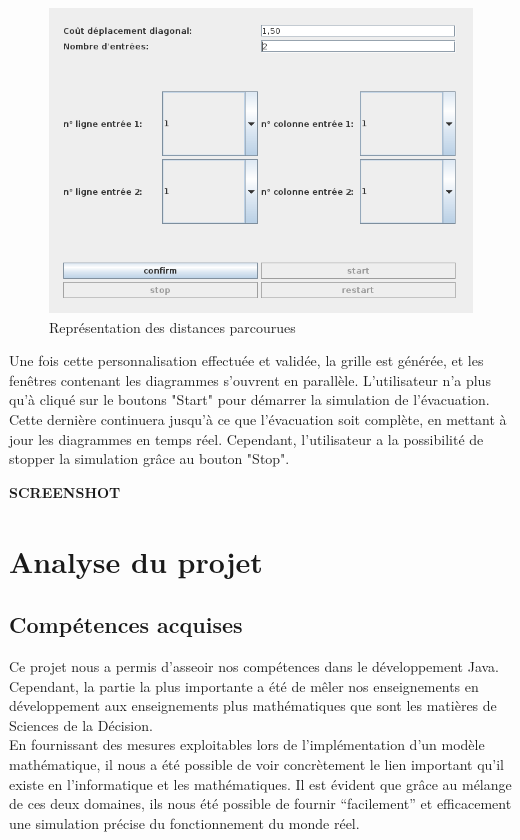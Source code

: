 \documentclass[twoside,UTF8]{EPURapport}
\begin{document}
		\begin{figure}[htb]
	\centering
	\includegraphics[scale=0.7]{imagesPNG/personnalisation.png}
	\caption{Représentation des distances parcourues}
	\label{fig:distances_parcourues}
	\end{figure}
		
		Une fois cette personnalisation effectuée et validée, la grille est générée, et les fenêtres contenant les diagrammes s'ouvrent en parallèle. L'utilisateur n'a plus qu'à cliqué sur le boutons "Start" pour démarrer la simulation de l'évacuation. Cette dernière continuera jusqu'à ce que l'évacuation soit complète, en mettant à jour les diagrammes en temps réel. Cependant, l'utilisateur a la possibilité de stopper la simulation grâce au bouton "Stop".
		
		\textbf{SCREENSHOT}
		
\chapter{Analyse du projet}
	\section{Compétences acquises}
	Ce projet nous a permis d'asseoir nos compétences dans le développement Java. Cependant, la partie la plus importante a été de mêler nos enseignements en développement aux enseignements plus mathématiques que sont les matières de Sciences de la Décision.\\
	
	En fournissant des mesures exploitables lors de l'implémentation d'un modèle mathématique, il nous a été possible de voir concrètement le lien important qu'il existe en l'informatique et les mathématiques. Il est évident que grâce au mélange de ces deux domaines, ils nous été possible de fournir ``facilement'' et efficacement une simulation précise du fonctionnement du monde réel.
	
\end{document}
